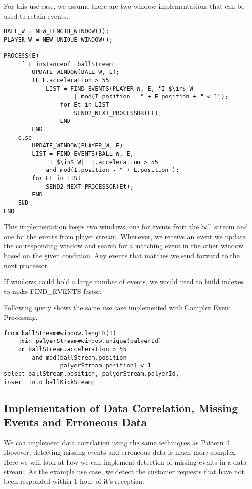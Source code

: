 \documentclass{sig-alternate}
\begin{document}
{For this use case, we assume there are two window implementations that can be used to retain events. 

\begin{lstlisting}[mathescape, showstringspaces=false]
BALL_W = NEW_LENGTH_WINDOW(1); 
PLAYER_W = NEW_UNIQUE_WINDOW();

PROCESS(E)
	if E instanceof  ballStream
		UPDATE_WINDOW(BALL_W, E);
		IF E.acceleration > 55
    		LIST = FIND_EVENTS(PLAYER_W, E, "I $\in$ W
    				| mod(I.position - " + E.position + " < 1");
				for Et in LIST
					SEND2_NEXT_PROCESSOR(Et);
				END	
		END
	else
		UPDATE_WINDOW(PLAYER_W, E)
		LIST = FIND_EVENTS(BALL_W, E,
			"I $\in$ W|  I.acceleration > 55
			and mod(I.position - " + E.position );
		for Et in LIST
			SEND2_NEXT_PROCESSOR(Et);
		END
	END
END  
\end{lstlisting}


 

This implementation keeps two windows, one for events from the ball stream and one for the events from player stream. Whenever, we receive an event we update the corresponding window and search for a matching event in the other window based on the given condition. Any events that matches we send forward to the next processor. 

If windows could hold a large number of events, we would need to build indexes to make FIND\_EVENTS faster. 

Following query shows the same use case implemented with Complex Event Processing.  


\begin{lstlisting}[mathescape]
from ballStream#window.length(1) 
	join palyerStream#window.unique(palyerId)
	on ballStream.acceleration > 55 
		and mod(ballStream.position - 
				palyerStream.position) < 1
select ballStream.position, palyerStream.palyerId,
insert into ballKickSteam;
\end{lstlisting}



\subsection{Implementation of Data Correlation, Missing Events and Erroneous Data}

We can implement data correlation using the same techniques as Pattern 4. However, detecting missing events and erroneous data is much more complex. Here we will look at how we can implement detection of missing events in a data stream. As the example use case, we detect the customer requests that have not been responded within 1 hour of it's reception.  


}
\end{document}

